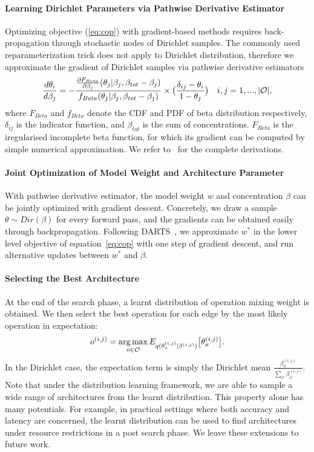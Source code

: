 \documentclass{article} \usepackage{iclr2021_conference,times}
\def\eqref#1{equation~\ref{#1}}
\DeclareMathOperator*{\argmax}{arg\,max}
\begin{document}
\paragraph{Learning Dirichlet Parameters via Pathwise Derivative Estimator}
Optimizing objective (\ref{eq:cop}) with gradient-based methods requires back-propagation through stochastic nodes of Dirichlet samples.
The commonly used reparameterization trick does not apply to Dirichlet distribution,
therefore we approximate the gradient of Dirichlet samples via pathwise derivative estimators~\citep{pathwise}
\begin{align}
	\label{eq:pathwise}
    \frac{d\theta_i}{d\beta_j} = -\frac{\frac{\partial{F_{Beta}}}{\partial{\beta_j}}(\theta_j| \beta_j, \beta_{tot} - \beta_j) }{f_{Beta}(\theta_j | \beta_j, \beta_{tot} - \beta_j)} \times \big{(} \frac{\delta_{ij} - \theta_i}{1 - \theta_j} \big{)} \quad i, j = 1, ..., |\mathcal{O}|,
\end{align}
where $F_{Beta}$ and $f_{Beta}$ denote the CDF and PDF of beta distribution respectively, $\delta_{ij}$ is the indicator function, and $\beta_{tot}$ is the sum of concentrations.
$F_{Beta}$ is the iregularised incomplete beta function, for which its gradient can be computed by simple numerical approximation.
We refer to~\citep{pathwise} for the complete derivations.

\paragraph{Joint Optimization of Model Weight and Architecture Parameter}
With pathwise derivative estimator, the model weight $w$ and concentration $\beta$ can be jointly optimized with gradient descent.
Concretely, we draw a sample $\theta \sim Dir(\beta)$  for every forward pass, and the gradients can be obtained easily through backpropagation.
Following DARTS~\citep{darts}, we approximate $w^*$ in the lower level objective of \eqref{eq:cop} with one step of gradient descent, and run alternative updates between $w^*$ and $\beta$.

\paragraph{Selecting the Best Architecture}
At the end of the search phase, a learnt distribution of operation mixing weight is obtained.
We then select the best operation for each edge by the most likely operation in expectation:
\begin{align}
    o^{(i,j)} = \argmax_{o\in \mathcal{O}} E_{q(\theta_o^{(i,j)}|\beta^{(i,j)})} \big{[}\theta_o^{(i,j)} \big{]}.
\end{align}
In the Dirichlet case, the expectation term is simply the Dirichlet mean $\frac{\beta_o^{(i,j)}}{\sum_{o'} \beta_{o'}^{(i,j)}}$.
Note that under the distribution learning framework, we are able to sample a wide range of architectures from the learnt distribution.
This property alone has many potentials.
For example, in practical settings where both accuracy and latency are concerned, the learnt distribution can be used to find architectures under resource restrictions in a post search phase.
We leave these extensions to future work. 
\end{document}
